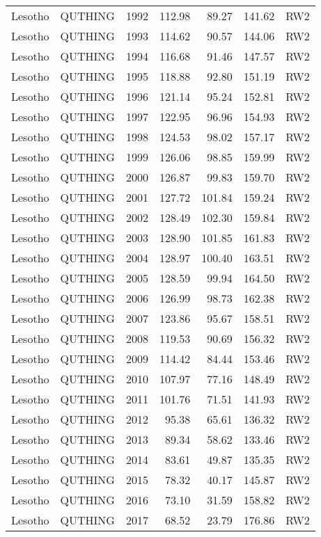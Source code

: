 \begin{longtable}{lllrrrl}
  Lesotho & QUTHING & 1992 & 112.98 & 89.27 & 141.62 & RW2 \\ 
  Lesotho & QUTHING & 1993 & 114.62 & 90.57 & 144.06 & RW2 \\ 
  Lesotho & QUTHING & 1994 & 116.68 & 91.46 & 147.57 & RW2 \\ 
  Lesotho & QUTHING & 1995 & 118.88 & 92.80 & 151.19 & RW2 \\ 
  Lesotho & QUTHING & 1996 & 121.14 & 95.24 & 152.81 & RW2 \\ 
  Lesotho & QUTHING & 1997 & 122.95 & 96.96 & 154.93 & RW2 \\ 
  Lesotho & QUTHING & 1998 & 124.53 & 98.02 & 157.17 & RW2 \\ 
  Lesotho & QUTHING & 1999 & 126.06 & 98.85 & 159.99 & RW2 \\ 
  Lesotho & QUTHING & 2000 & 126.87 & 99.83 & 159.70 & RW2 \\ 
  Lesotho & QUTHING & 2001 & 127.72 & 101.84 & 159.24 & RW2 \\ 
  Lesotho & QUTHING & 2002 & 128.49 & 102.30 & 159.84 & RW2 \\ 
  Lesotho & QUTHING & 2003 & 128.90 & 101.85 & 161.83 & RW2 \\ 
  Lesotho & QUTHING & 2004 & 128.97 & 100.40 & 163.51 & RW2 \\ 
  Lesotho & QUTHING & 2005 & 128.59 & 99.94 & 164.50 & RW2 \\ 
  Lesotho & QUTHING & 2006 & 126.99 & 98.73 & 162.38 & RW2 \\ 
  Lesotho & QUTHING & 2007 & 123.86 & 95.67 & 158.51 & RW2 \\ 
  Lesotho & QUTHING & 2008 & 119.53 & 90.69 & 156.32 & RW2 \\ 
  Lesotho & QUTHING & 2009 & 114.42 & 84.44 & 153.46 & RW2 \\ 
  Lesotho & QUTHING & 2010 & 107.97 & 77.16 & 148.49 & RW2 \\ 
  Lesotho & QUTHING & 2011 & 101.76 & 71.51 & 141.93 & RW2 \\ 
  Lesotho & QUTHING & 2012 & 95.38 & 65.61 & 136.32 & RW2 \\ 
  Lesotho & QUTHING & 2013 & 89.34 & 58.62 & 133.46 & RW2 \\ 
  Lesotho & QUTHING & 2014 & 83.61 & 49.87 & 135.35 & RW2 \\ 
  Lesotho & QUTHING & 2015 & 78.32 & 40.17 & 145.87 & RW2 \\ 
  Lesotho & QUTHING & 2016 & 73.10 & 31.59 & 158.82 & RW2 \\ 
  Lesotho & QUTHING & 2017 & 68.52 & 23.79 & 176.86 & RW2 \\ 

\end{longtable}
